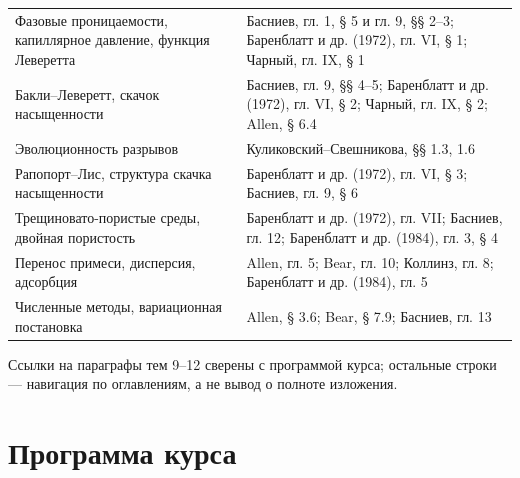 \documentclass[
  11pt,
]{article}
\begin{document}
\begin{longtable}[]{@{}
  >{\raggedright\arraybackslash}p{}
  >{\raggedright\arraybackslash}p{}@{}}
Фазовые проницаемости, капиллярное давление, функция Леверетта & Басниев, гл. 1, § 5 и гл. 9, §§ 2--3; Баренблатт и др. (1972), гл. VI, § 1; Чарный, гл. IX, § 1 \\
Бакли--Леверетт, скачок насыщенности & Басниев, гл. 9, §§ 4--5; Баренблатт и др. (1972), гл. VI, § 2; Чарный, гл. IX, § 2; Allen, § 6.4 \\
Эволюционность разрывов & Куликовский--Свешникова, §§ 1.3, 1.6 \\
Рапопорт--Лис, структура скачка насыщенности & Баренблатт и др. (1972), гл. VI, § 3; Басниев, гл. 9, § 6 \\
Трещиновато-пористые среды, двойная пористость & Баренблатт и др. (1972), гл. VII; Басниев, гл. 12; Баренблатт и др. (1984), гл. 3, § 4 \\
Перенос примеси, дисперсия, адсорбция & Allen, гл. 5; Bear, гл. 10; Коллинз, гл. 8; Баренблатт и др. (1984), гл. 5 \\
Численные методы, вариационная постановка & Allen, § 3.6; Bear, § 7.9; Басниев, гл. 13 \\
\end{longtable}

Ссылки на параграфы тем 9--12 сверены с программой курса; остальные строки --- навигация по оглавлениям, а не вывод о полноте изложения.


\section{Программа курса}\label{section-04}
\end{document}
